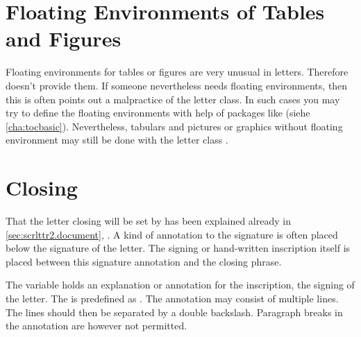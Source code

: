 \section{Floating Environments of Tables and Figures}
\label{sec:scrlttr2.floats}

Floating environments for tables or figures are very unusual in
letters. Therefore  doesn't provide
them. If someone nevertheless needs floating environments, then this is often
points out a malpractice of the letter class. In such cases you may try to
define the floating environments with help of packages like  (siehe
\autoref{cha:tocbasic}). Nevertheless, tabulars and pictures or graphics
without floating environment may still be done with the letter class
.




\section{Closing}
\label{sec:scrlttr2.closing}
%
%
%
%

That the letter closing will be set by  has
been explained already in \autoref{sec:scrlttr2.document},
. A kind of annotation to the signature
is often placed below the signature of the letter. The signing or hand-written
inscription itself is placed between this signature annotation and the closing
phrase.

\begin{Declaration}
\end{Declaration}
%
The variable  holds an explanation or annotation for the
inscription, the signing of the letter. The  is predefined as
.  The annotation may consist
of multiple lines. The lines should then be separated by a double
backslash. Paragraph breaks in the annotation are however
not permitted.%


